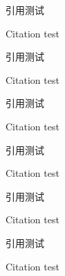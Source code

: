 \documentclass{article}
\begin{document}
\begin{multicols}{2}
引用\cite{sally_history_1985,foo}测试\par
Citation \cite{sally_history_1985,foo} test\par
引用\parencite{sally_history_1985,foo}测试\par
Citation \parencite{sally_history_1985,foo} test\par
引用\citet{sally_history_1985,foo}测试\par
Citation \citet{sally_history_1985,foo} test\par
引用\citep{sally_history_1985,foo}测试\par
Citation \citep{sally_history_1985,foo} test\par
引用\textcite{sally_history_1985,foo}测试\par
Citation \textcite{sally_history_1985,foo} test\par
引用测试\par
Citation  test\par

\end{multicols}

\printbibliography
\end{document}
